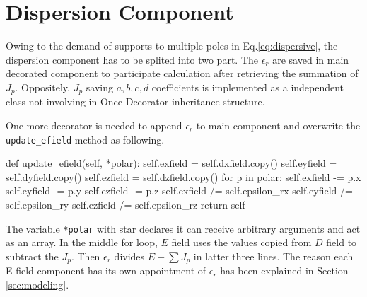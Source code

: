\section{Dispersion Component}
Owing to the demand of supports to multiple poles in Eq.\ref{eq:dispersive}, the dispersion component has to be splited
into two part. The $\epsilon_r$ are saved in main decorated component to participate calculation after retrieving the
summation of $J_p$. Oppositely, $J_p$ saving $a,b,c,d$ coefficients is implemented as a independent class not involving
in Once Decorator inheritance structure.

One more decorator is needed to append $\epsilon_r$ to main component and overwrite the \texttt{update\_efield} method
as following. 
\begin{code}
    def update_efield(self, *polar):
        self.exfield  = self.dxfield.copy()
        self.eyfield  = self.dyfield.copy()
        self.ezfield  = self.dzfield.copy()
        for p in polar:
            self.exfield -= p.x
            self.eyfield -= p.y
            self.ezfield -= p.z
        self.exfield /= self.epsilon_rx
        self.eyfield /= self.epsilon_ry
        self.ezfield /= self.epsilon_rz
        return self
\end{code}
The variable \texttt{*polar} with star declares it can receive arbitrary arguments and act as an array. In the middle
for loop, $E$ field uses the values copied from $D$ field to subtract the $J_p$. Then $\epsilon_r$ divides $E - \sum
J_p$ in latter three lines. The reason each E field component has its own appointment of $\epsilon_{r}$ has been
explained in Section \ref{sec:modeling}.

